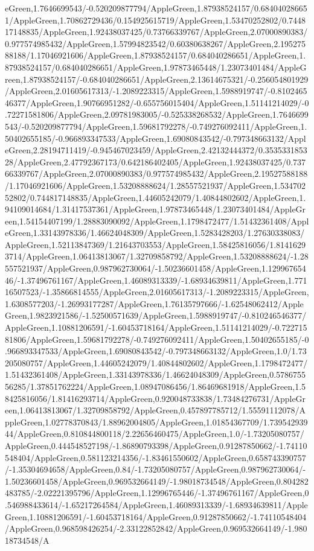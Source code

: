 {\begin{tikzternal}
eGreen,1.7646699543/-0.520209877794/AppleGreen,1.87938524157/0.684040286651/AppleGreen,1.70862729436/0.154925615719/AppleGreen,1.53470252802/0.744817148835/AppleGreen,1.92438037425/0.73766339767/AppleGreen,2.07000890383/0.977574985432/AppleGreen,1.57994823542/0.60380638267/AppleGreen,2.19527588188/1.17046921606/AppleGreen,1.87938524157/0.684040286651/AppleGreen,1.87938524157/0.684040286651/AppleGreen,1.97873465448/1.23073401484/AppleGreen,1.87938524157/-0.684040286651/AppleGreen,2.13614675321/-0.256054801929/AppleGreen,2.01605617313/-1.2089223315/AppleGreen,1.5988919747/-0.810246546377/AppleGreen,1.90766951282/-0.655756015404/AppleGreen,1.51141214029/-0.72271581806/AppleGreen,2.09781983005/-0.525338268532/AppleGreen,1.7646699543/-0.520209877794/AppleGreen,1.59681792278/-0.749276092411/AppleGreen,1.50402655185/-0.966893347533/AppleGreen,1.69080843542/-0.797348663132/AppleGreen,2.28194711419/-0.945467023459/AppleGreen,2.42132444372/0.353533185328/AppleGreen,2.47792367173/0.642186402405/AppleGreen,1.92438037425/0.73766339767/AppleGreen,2.07000890383/0.977574985432/AppleGreen,2.19527588188/1.17046921606/AppleGreen,1.53208888624/1.28557521937/AppleGreen,1.53470252802/0.744817148835/AppleGreen,1.44605242079/1.40844802602/AppleGreen,1.94109014684/1.31417537361/AppleGreen,1.97873465448/1.23073401484/AppleGreen,1.54154407199/1.28883090092/AppleGreen,1.1798472477/1.51432361408/AppleGreen,1.33143978336/1.46624048309/AppleGreen,1.5283428203/1.27630338083/AppleGreen,1.52113847369/1.21643703553/AppleGreen,1.58425816056/1.81416293714/AppleGreen,1.06413813067/1.32709858792/AppleGreen,1.53208888624/-1.28557521937/AppleGreen,0.987962730064/-1.50236601458/AppleGreen,1.12996765446/-1.37496761167/AppleGreen,1.46089313339/-1.68934639811/AppleGreen,1.77116507523/-1.35866814555/AppleGreen,2.01605617313/-1.2089223315/AppleGreen,1.6308577203/-1.26993177287/AppleGreen,1.76135797666/-1.62548062412/AppleGreen,1.9823921586/-1.52500571639/AppleGreen,1.5988919747/-0.810246546377/AppleGreen,1.10881206591/-1.60453718164/AppleGreen,1.51141214029/-0.72271581806/AppleGreen,1.59681792278/-0.749276092411/AppleGreen,1.50402655185/-0.966893347533/AppleGreen,1.69080843542/-0.797348663132/AppleGreen,1.0/1.73205080757/AppleGreen,1.44605242079/1.40844802602/AppleGreen,1.1798472477/1.51432361408/AppleGreen,1.33143978336/1.46624048309/AppleGreen,0.578675556285/1.37851762224/AppleGreen,1.08947086456/1.86469681918/AppleGreen,1.58425816056/1.81416293714/AppleGreen,0.920048733838/1.73484276731/AppleGreen,1.06413813067/1.32709858792/AppleGreen,0.457897785712/1.55591112078/AppleGreen,1.02778370843/1.88962004805/AppleGreen,1.01854367709/1.73954293944/AppleGreen,0.810844800118/2.22656460475/AppleGreen,1.0/-1.73205080757/AppleGreen,0.444548527198/-1.86890793398/AppleGreen,0.91287850662/-1.74110548404/AppleGreen,0.581123214356/-1.83461550602/AppleGreen,0.658743390757/-1.35304694658/AppleGreen,0.84/-1.73205080757/AppleGreen,0.987962730064/-1.50236601458/AppleGreen,0.969532664149/-1.98018734548/AppleGreen,0.804282483785/-2.02221395796/AppleGreen,1.12996765446/-1.37496761167/AppleGreen,0.546988433614/-1.65217264584/AppleGreen,1.46089313339/-1.68934639811/AppleGreen,1.10881206591/-1.60453718164/AppleGreen,0.91287850662/-1.74110548404/AppleGreen,0.968598426254/-2.33122852842/AppleGreen,0.969532664149/-1.98018734548/A
\end{tikzternal}}

